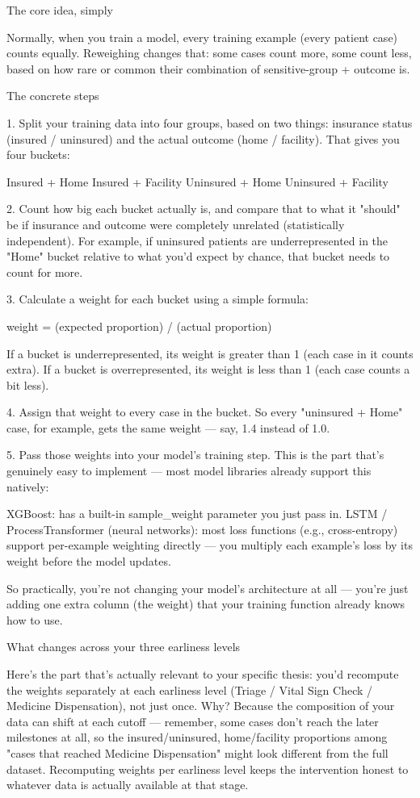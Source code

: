 \documentclass[authoryear,preprint,12pt]{elsarticle}
\begin{document}
The core idea, simply

Normally, when you train a model, every training example (every patient case) counts equally. Reweighing changes that: some cases count more, some count less, based on how rare or common their combination of sensitive-group + outcome is.

The concrete steps

1. Split your training data into four groups, based on two things: insurance status (insured / uninsured) and the actual outcome (home / facility). That gives you four buckets:

Insured + Home
Insured + Facility
Uninsured + Home
Uninsured + Facility

2. Count how big each bucket actually is, and compare that to what it "should" be if insurance and outcome were completely unrelated (statistically independent). For example, if uninsured patients are underrepresented in the "Home" bucket relative to what you'd expect by chance, that bucket needs to count for more.

3. Calculate a weight for each bucket using a simple formula:

weight = (expected proportion) / (actual proportion)

If a bucket is underrepresented, its weight is greater than 1 (each case in it counts extra). If a bucket is overrepresented, its weight is less than 1 (each case counts a bit less).

4. Assign that weight to every case in the bucket. So every "uninsured + Home" case, for example, gets the same weight — say, 1.4 instead of 1.0.

5. Pass those weights into your model's training step. This is the part that's genuinely easy to implement — most model libraries already support this natively:

XGBoost: has a built-in sample\_weight parameter you just pass in.
LSTM / ProcessTransformer (neural networks): most loss functions (e.g., cross-entropy) support per-example weighting directly — you multiply each example's loss by its weight before the model updates.

So practically, you're not changing your model's architecture at all — you're just adding one extra column (the weight) that your training function already knows how to use.

What changes across your three earliness levels

Here's the part that's actually relevant to your specific thesis: you'd recompute the weights separately at each earliness level (Triage / Vital Sign Check / Medicine Dispensation), not just once. Why? Because the composition of your data can shift at each cutoff — remember, some cases don't reach the later milestones at all, so the insured/uninsured, home/facility proportions among "cases that reached Medicine Dispensation" might look different from the full dataset. Recomputing weights per earliness level keeps the intervention honest to whatever data is actually available at that stage.
\end{document}
